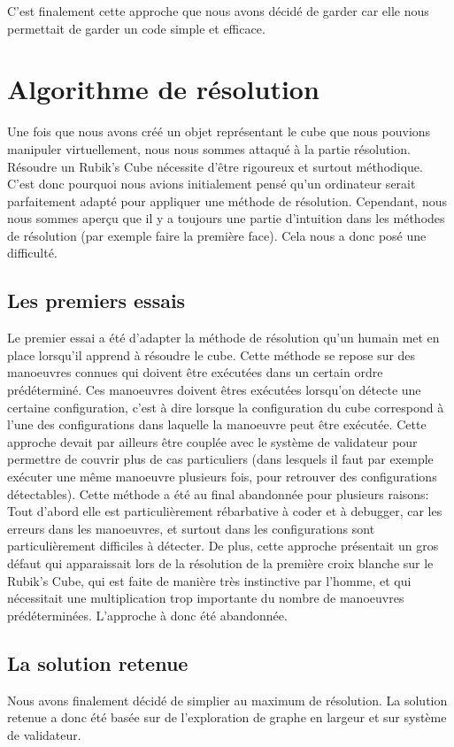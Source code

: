 C'est finalement cette approche que nous avons décidé de garder car elle nous permettait de garder un code simple et efficace.

\section{Algorithme de résolution}
Une fois que nous avons créé un objet représentant le cube que nous pouvions manipuler virtuellement, nous nous sommes attaqué à la partie résolution.
Résoudre un Rubik's Cube nécessite d'être rigoureux et surtout méthodique.
C'est donc pourquoi nous avions initialement pensé qu'un ordinateur serait parfaitement adapté pour appliquer une méthode de résolution.
Cependant, nous nous sommes aperçu que il y a toujours une partie d'intuition dans les méthodes de résolution (par exemple faire la première face).
Cela nous a donc posé une difficulté.

\subsection{Les premiers essais}
Le premier essai a été d'adapter la méthode de résolution qu'un humain met en place lorsqu'il apprend à résoudre le cube. Cette méthode se repose sur des manoeuvres connues qui doivent être exécutées dans un certain ordre prédéterminé.
Ces manoeuvres doivent êtres exécutées lorsqu'on détecte une certaine configuration, c'est à dire lorsque la configuration du cube correspond à l'une des configurations dans laquelle la manoeuvre peut être exécutée. Cette approche devait par ailleurs être couplée avec le système de validateur pour permettre de couvrir plus de cas particuliers (dans lesquels il faut par exemple exécuter une même manoeuvre plusieurs fois, pour retrouver des configurations détectables).
Cette méthode a été au final abandonnée pour plusieurs raisons: Tout d'abord elle est particulièrement rébarbative à coder et à debugger, car les erreurs dans les manoeuvres, et surtout dans les configurations sont particulièrement difficiles à détecter.
De plus, cette approche présentait un gros défaut qui apparaissait lors de la résolution de la première croix blanche sur le Rubik's Cube, qui est faite de manière très instinctive par l'homme, et qui nécessitait une multiplication trop importante du nombre de manoeuvres prédéterminées.
L'approche à donc été abandonnée.
\subsection{La solution retenue}
Nous avons finalement décidé de simplier au maximum de résolution.
La solution retenue a donc été basée sur de l'exploration de graphe en largeur et sur système de validateur.

